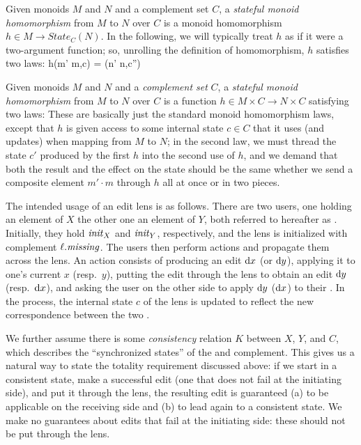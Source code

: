 \begin{defn}
    Given monoids $M$ and $N$ and a complement set $C$, a \emph{stateful
    monoid homomorphism} from $M$ to $N$ over $C$ is a monoid
    homomorphism $h \in M \to \mathit{State}_C(N)$. In the following, we
    will typically treat $h$ as if it were a two-argument function; so,
    unrolling the definition of homomorphism, $h$ satisfies two laws:
            {h(m' \cdot m,c) = (n' \cdot n,c'')}
\end{defn}
\else
\begin{defn}
Given monoids $M$ and $N$ and a {\em complement set} $C$, a \emph{stateful monoid
  homomorphism} from $M$ to $N$ over $C$ is a function $h \in M \times C \to
N \times C$ satisfying two laws:
%
\vspace*{-1ex}
%
These are basically just the standard monoid homomorphism laws, except that
$h$ is given access to some internal state $c \in C$ that it uses (and
updates) when mapping from $M$ to $N$; in the second law, we must thread the
state $c'$ produced by the first $h$ into the second use of $h$, and we
demand that both the result and the effect on the state should be the same
whether we send a composite element $m' \cdot m$ through $h$ all at once or
in two pieces.
\end{defn}
\fi

The intended usage of an edit lens is as follows. There are two users,
one holding an element of $X$ the other one an element of $Y$\ifdelta, both
referred to hereafter as {\em \replicas}\fi. Initially, they hold $\mathit{init}_X$ and
$\mathit{init}_Y$, respectively, and the lens is initialized with complement
$\ell.\mathit{missing}$. The users then perform actions and propagate them across
the lens. An action consists of producing an edit $\textrm{d} x$ (or $\textrm{d} y$), applying
it to one's current \replica $x$ (resp.\ $y$), putting the edit through the lens
to obtain an edit $\textrm{d} y$ (resp.\ $\textrm{d} x$), and asking the user on the other
side to apply $\textrm{d} y$ ($\textrm{d} x$) to their \replica.  In the process, the internal
state $c$ of the lens is updated to reflect the new correspondence between
the two \replicas.
\iffull

\fi%
We further assume there is some {\em consistency} relation $K$ between $X$,
$Y$, and $C$, which describes the ``synchronized states'' of the \replicas
and complement.  This gives us a natural way to state the totality
requirement discussed above: if we start in a consistent state, make a
successful edit (one that does not fail at the initiating side), and put it
through the lens, the resulting edit is guaranteed (a) to be applicable on
the receiving side and (b) to lead again to a consistent state.  We make no
guarantees about edits that fail at the initiating side: these should not be
put through the lens.

